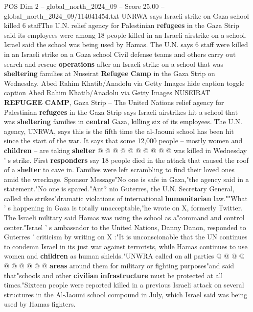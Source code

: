 \begin{textsample}{POS Dim 2 – global\_north\_2024\_09 – Score 25.00 – global\_north\_2024\_09/114041454.txt}  \label{ex:f2_pos_413}
UNRWA says Israeli strike on Gaza school killed 6 staffThe U.N. relief agency for Palestinian \textbf{refugees} in the Gaza Strip said its employees were among 18 people killed in an Israeli airstrike on a school.
Israel said the school was being used by Hamas.
The U.N. says 6 staff were killed in an Israeli strike on a Gaza school Civil defense teams and others carry out search and rescue \textbf{operations} after an Israeli strike on a school that was \textbf{sheltering} families at Nuseirat \textbf{Refugee} \textbf{Camp} in the Gaza Strip on Wednesday.
Abed Rahim Khatib/Anadolu via Getty Images hide caption toggle caption Abed Rahim Khatib/Anadolu via Getty Images NUSEIRAT \textbf{REFUGEE} \textbf{CAMP}, Gaza Strip -- The United Nations relief agency for Palestinian \textbf{refugees} in the Gaza Strip says Israeli airstrikes hit a school that was \textbf{sheltering} families in \textbf{central} Gaza, killing six of its employees.
The U.N. agency, UNRWA, says this is the fifth time the al-Jaouni school has been hit since the start of the war.
It says that some 12,000 people -- mostly women and \textbf{children} -- are taking \textbf{shelter} @ @ @ @ @ @ @ @ @ @ was killed in Wednesday ' s strike.
First \textbf{responders} say 18 people died in the attack that caused the roof of a \textbf{shelter} to cave in.
Families were left scrambling to find their loved ones amid the wreckage.
Sponsor Message"No one is safe in Gaza,"the agency said in a statement."No one is spared."Ant? nio Guterres, the U.N.
Secretary General, called the strikes"dramatic violations of international \textbf{humanitarian} law.""What ' s happening in Gaza is totally unacceptable,"he wrote on X, formerly Twitter.
The Israeli military said Hamas was using the school as a"command and control center."Israel ' s ambassador to the United Nations, Danny Danon, responded to Guterres ' criticism by writing on X :"It is unconscionable that the UN continues to condemn Israel in its just war against terrorists, while Hamas continues to use women and \textbf{children} as human shields."UNWRA called on all parties @ @ @ @ @ @ @ @ @ @ \textbf{areas} around them for military or fighting purposes"and said that"schools and other \textbf{civilian} \textbf{infrastructure} must be protected at all times."Sixteen people were reported killed in a previous Israeli attack on several structures in the Al-Jaouni school compound in July, which Israel said was being used by Hamas fighters.

\end{textsample}
